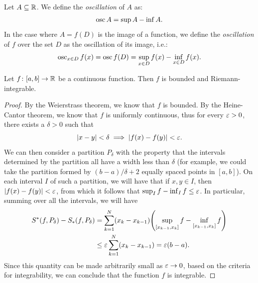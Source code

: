 \begin{definition}\label{def:osc}
Let $A\subseteq {\mathbb R}$. We define 
the \emph{oscillation} of $A$ as:
\[
  \operatorname{osc} A = \sup A - \inf A.
\]
In the case where $A=f(D)$ is the image of a function, 
we define the \emph{oscillation} of $f$ over the set 
$D$ as the oscillation of its image, i.e.:
\[
   \operatorname{osc}_{x\in D} f(x) 
   = \operatorname{osc} f(D) 
   = \sup_{x\in D} f(x) - \inf_{x\in D} f(x).  
\]
\end{definition}

\begin{theorem}
  \mymark{***}%
  \label{th:integrabilita_continue}%
  Let $f\colon [a,b]\to {\mathbb R}$ be a continuous function.
  Then $f$ is bounded and Riemann-integrable.
  \end{theorem}
  \begin{proof}
  \mymark{***}
  By the Weierstrass theorem, we know that $f$ is bounded.
  By the Heine-Cantor theorem, we know that $f$ is uniformly continuous,
  thus for every $\varepsilon>0$, there exists a $\delta>0$ such that
  \[
   {\left|x-y\right|} < \delta \implies {\left|f(x)-f(y)\right|} < \varepsilon.
  \]
  We can then consider a partition $P_\delta$ with the property that
  the intervals determined by the partition all have a width less than
  $\delta$ (for example, we could take the partition formed by
    $(b-a)/\delta+2$ equally spaced points in $[a,b]$). On each interval $I$ of
  such
    a partition, we will have that if $x,y\in I$, then ${\left|f(x)-f(y)\right|} < \varepsilon$,
  from which
  it follows that $\sup_I f - \inf_I f \le \varepsilon$.
  In particular, summing over all the intervals, we will have
  \begin{align*}
    S^*(f,P_\delta) - S_*(f,P_\delta)
        &= \sum_{k=1}^N (x_k-x_{k-1}){\left( \sup_{[x_{k-1},x_k]} f -
    \inf_{[x_{k-1},x_k]} f \right)} \\
    &\le \varepsilon \sum_{k=1}^N (x_k - x_{k-1})
     = \varepsilon (b-a).
  \end{align*}
  Since this quantity can be made arbitrarily small as
    $\varepsilon \to 0$, based on the criteria for integrability, we can conclude that
  the
  function $f$ is integrable.
  \end{proof}
  
